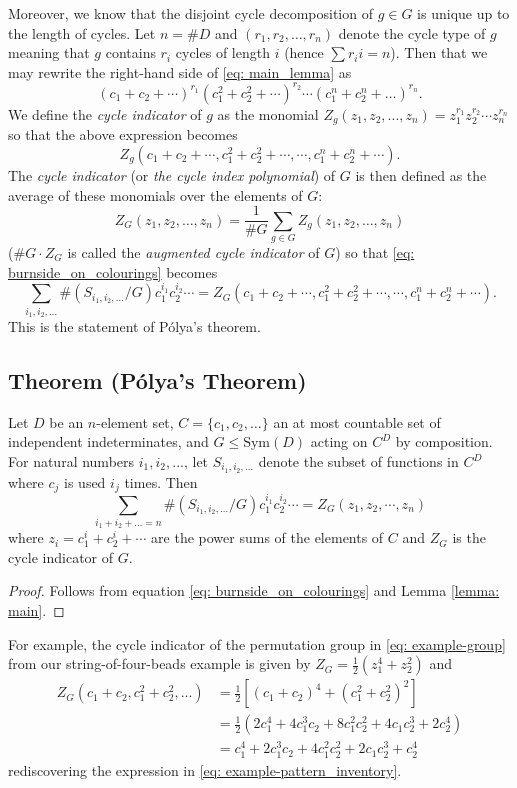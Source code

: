 \documentclass[a4paper,11pt]{article}
\numberwithin{equation}{section}
\begin{document}
    Moreover, we know that the disjoint cycle decomposition of $g\in G$ is unique up to the length of cycles. Let $n=\#D$ and $(r_{1},r_{2}, \dots,r_{n})$ denote the cycle type of $g$ meaning that $g$ contains $r_{i}$ cycles of length $i$ (hence $\sum r_{i}i = n$). Then that we may rewrite the right-hand side of \eqref{eq: main_lemma} as \[(c_{1}+c_{2}+\cdots)^{r_{1}}(c_{1}^2+c_{2}^2+\cdots)^{r_{2}}\cdots(c_{1}^{n}+c_{2}^{n}+\dots)^{r_{n}}. \]We define the \textit{cycle indicator} of $g$ as the monomial $Z_g(z_1, z_2,...,z_n) = z_1^{r_1} z_{2}^{r_2} \cdots z_n^{r_n}$ so that the above expression becomes \[ Z_{g}(c_1 + c_2 +  \cdots, c_1^2 + c_2^2 + \cdots, \cdots, c_1^n +c_2^n + \cdots) .\]  The \textit{cycle indicator} (or \textit{the cycle index polynomial}) of $G$ is then defined as the average of these monomials over the elements of $G$: $$Z_{G}(z_{1},z_{2},\dots,z_{n}) = \frac{1}{\# G} \sum_{g \in G} Z_{g}(z_{1},z_{2},\dots,z_{n})$$($\#G \cdot Z_G$ is called the \textit{augmented cycle indicator} of $G$) so that \eqref{eq: burnside_on_colourings} becomes \[\sum_{i_{1}, i_{2}, \dots} \#(S_{i_{1}, i_{2}, \dots} / G)  c_1^{i_1}c_{2}^{i_2}\cdots = Z_G(c_1 + c_2 +  \cdots, c_1^2 + c_2^2 + \cdots, \cdots, c_1^n +c_2^n + \cdots) .\] This is the statement of Pólya's theorem. 

    \subsection{Theorem \textnormal{(Pólya's Theorem)}} \label{thm: Polya} Let $D$ be an $n$-element set, $C=\{c_1, c_2, \dots\}$ an at most countable set of independent indeterminates, and $G \leq \text{Sym}(D)$ acting on $C^D$ by composition. For natural numbers $i_{1}, i_{2}, ...$, let $S_{i_1, i_2, ...}$ denote the subset of functions in $C^D$ where $c_j$ is used $i_j$ times. Then \begin{equation}
    \sum_{i_{1}+ i_{2}+\dots =n } \# (S_{i_{1}, i_{2}, \dots}/G)  c_{1}^{i_{1}}c_{2}^{i_{2}} \cdots  =  Z_{G}(z_{1}, z_{2}, \cdots, z_{n}) \label{eq: Polya_s_theorem} 
    \end{equation}
    where $z_{i} = c_1^i+c_2^i + \cdots$ are the power sums of the elements of $C$ and $Z_G$ is the cycle indicator of $G$. 

    \begin{proof}
    Follows from equation \eqref{eq: burnside_on_colourings} and Lemma \ref{lemma: main}.
    \end{proof}
 
    For example, the cycle indicator of the permutation group  in \eqref{eq: example-group} from our string-of-four-beads example is given by \( Z_{G} = \frac{1}{2} (z_1^4 + z_2^2 ) \) and 
    \begin{align*}
        Z_G(c_1 + c_2, c_1^2 + c_2^2, ...) &= \frac{1}{2} \left [ (c_1+c_2)^{4} + (c_1^2 + c_2^2)^2 \right] \\ 
        &= \frac{1}{2} (2c_1^4  + 4c_1^3c_2 + 8c_1^2c_2^2 + 4c_1c_2^3 + 2c_2^4 ) \\
        &= c_1^4 + 2c_1^3c_2 + 4 c_1^2c_2^2 + 2c_1c_2^3 + c_2^4
    \end{align*}rediscovering the expression in \eqref{eq: example-pattern_inventory}. \medskip
\end{document}
